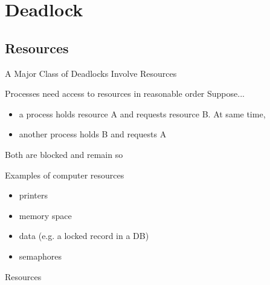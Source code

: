 \begin{frame}
  \begin{refsection}
    \nocite{wiki:sched} \printbibliography[heading=none]
  \end{refsection}
\end{frame}


\section{Deadlock}
\label{sec:deadlock}

\subsection{Resources}
\label{sec:resources}

\begin{frame}{A Major Class of Deadlocks Involve Resources}
  \begin{block}{Processes need access to resources in reasonable order}
    Suppose...
    \begin{itemize}
    \item a process holds resource A and requests resource B. At same time,
    \item another process holds B and requests A
    \end{itemize}
    Both are blocked and remain so
  \end{block}
  \begin{block}{Examples of computer resources}
    \begin{itemize}
    \item printers
    \item memory space
    \item data (e.g. a locked record in a DB)
    \item semaphores
    \end{itemize}
  \end{block}
\end{frame}

\begin{frame}{Resources}
  \centering
  \mode<beamer>{ \texttt{[image: deadlock-resource]} }%
\end{frame}


